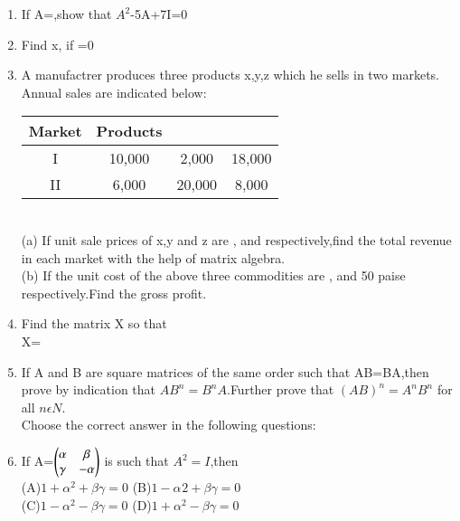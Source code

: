 \begin{enumerate}[label=\arabic*.,ref=\thesubsection.\theenumi]
  \item If A=,show that $A^{2}$-5A+7I=0\\
\solution

  \item Find x, if =0\\
  \item A manufactrer produces three products x,y,z which he sells in two markets. Annual sales are indicated below:\\
 
  \begin{tabular}{cccc}
  \hline
  Market & Products\\
  \hline
  I &10,000 &2,000 &18,000\\
  \hline
  II &6,000 &20,000 &8,000\\
  \hline
  \end{tabular}\\
  (a) If unit sale prices of x,y and z are , and  respectively,find the total revenue in each market with the help of matrix algebra.\\
  (b) If the unit cost of the above three commodities are , and 50 paise respectively.Find the gross profit.\\
  \item Find the matrix X so that\\ X=\\
  \item If A and B are square matrices of the same order such that AB=BA,then prove by indication that $AB^{n}=B^{n}A$.Further prove that $(AB)^{n}=A^{n}B^{n}$ for all $n \epsilon N$.\\
  Choose the correct answer in the following questions:\\
  \item If A=$\begin{pmatrix}\alpha &\beta\\ \gamma &-\alpha\end{pmatrix}$ is such that $A^{2}=I$,then\\
  (A)$1+\alpha^{2}+\beta\gamma=0$ (B)$1-\alpha^{}2+\beta\gamma=0$\\
  (C)$1-\alpha^{2}-\beta\gamma=0$ (D)$1+\alpha^{2}-\beta\gamma=0$\\

\end{enumerate}
